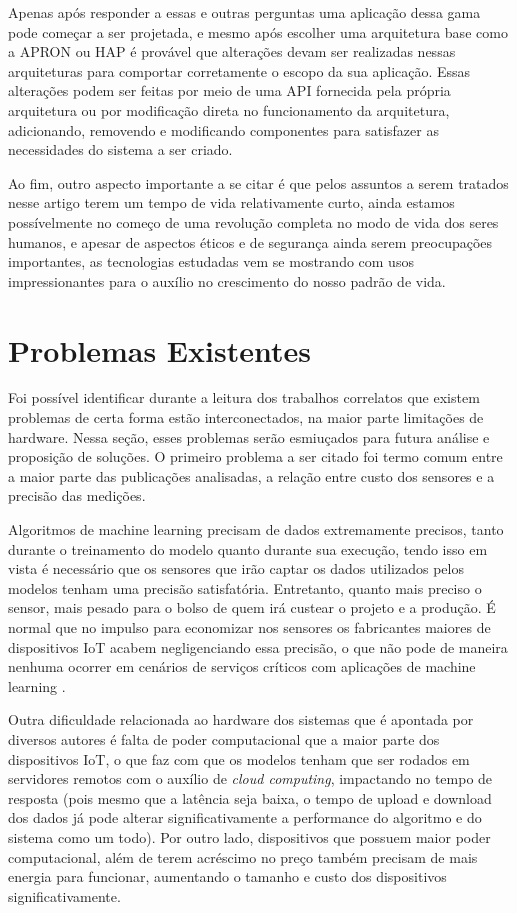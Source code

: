 \documentclass[12pt]{article}
\begin{document}
Apenas após responder a essas e outras perguntas uma aplicação dessa gama pode começar a ser projetada, e mesmo após escolher uma arquitetura base como a APRON ou HAP é provável que alterações devam ser realizadas nessas arquiteturas para comportar corretamente o escopo da sua aplicação. Essas alterações podem ser feitas por meio de uma API fornecida pela própria arquitetura ou por modificação direta no funcionamento da arquitetura, adicionando, removendo e modificando componentes para satisfazer as necessidades do sistema a ser criado.

Ao fim, outro aspecto importante a se citar é que pelos assuntos a serem tratados nesse artigo terem um tempo de vida relativamente curto, ainda estamos possívelmente no começo de uma revolução completa no modo de vida dos seres humanos, e apesar de aspectos éticos e de segurança ainda serem preocupações importantes, as tecnologias estudadas vem se mostrando com usos impressionantes para o auxílio no crescimento do nosso padrão de vida.

\section{Problemas Existentes}

Foi possível identificar durante a leitura dos trabalhos correlatos que existem problemas de certa forma estão interconectados, na maior parte limitações de hardware. Nessa seção, esses problemas serão esmiuçados para futura análise e proposição de soluções. O primeiro problema a ser citado foi termo comum entre a maior parte das publicações analisadas, a relação entre custo dos sensores e a precisão das medições.

Algoritmos de machine learning precisam de dados extremamente precisos, tanto durante o treinamento do modelo quanto durante sua execução, tendo isso em vista é necessário que os sensores que irão captar os dados utilizados pelos modelos tenham uma precisão satisfatória. Entretanto, quanto mais preciso o sensor, mais pesado para o bolso de quem irá custear o projeto e a produção. É normal que no impulso para economizar nos sensores os fabricantes maiores de dispositivos IoT acabem negligenciando essa precisão, o que não pode de maneira nenhuma ocorrer em cenários de serviços críticos com aplicações de machine learning \cite{sacco}.

Outra dificuldade relacionada ao hardware dos sistemas que é apontada por diversos autores é falta de poder computacional que a maior parte dos dispositivos IoT, o que faz com que os modelos tenham que ser rodados em servidores remotos com o auxílio de \emph{cloud computing}, impactando no tempo de resposta (pois mesmo que a latência seja baixa, o tempo de upload e download dos dados já pode alterar significativamente a performance do algoritmo e do sistema como um todo). Por outro lado, dispositivos que possuem maior poder computacional, além de terem acréscimo no preço também precisam de mais energia para funcionar, aumentando o tamanho e custo dos dispositivos significativamente.
\end{document}
